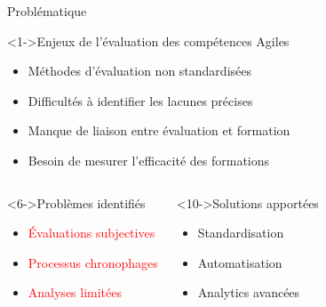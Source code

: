 \documentclass[aspectratio=169]{beamer}
\begin{document}
\begin{frame}{Problématique}
    \begin{block}<1->{Enjeux de l'évaluation des compétences Agiles}
        \begin{itemize}
            \item<2-> Méthodes d'évaluation non standardisées
            \item<3-> Difficultés à identifier les lacunes précises
            \item<4-> Manque de liaison entre évaluation et formation
            \item<5-> Besoin de mesurer l'efficacité des formations
        \end{itemize}
    \end{block}

    \begin{columns}
        \begin{block}<6->{Problèmes identifiés}
            \begin{itemize}
                \item<7-> \textcolor{red}{Évaluations subjectives}
                \item<8-> \textcolor{red}{Processus chronophages}
                \item<9-> \textcolor{red}{Analyses limitées}
            \end{itemize}
        \end{block}

        \begin{block}<10->{Solutions apportées}
            \begin{itemize}
                \item<11-> \textcolor{greencap}{Standardisation}
                \item<12-> \textcolor{greencap}{Automatisation}
                \item<13-> \textcolor{greencap}{Analytics avancées}
            \end{itemize}
        \end{block}
    \end{columns}

\end{frame}
\end{document}
